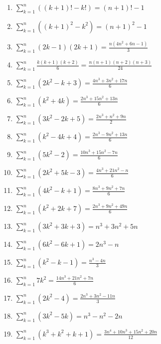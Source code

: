 \documentclass[11pt,a4paper]{article}
\begin{document}
\begin{enumerate}
\item $\displaystyle \sum_{k=1}^{n} \left(\left(k + 1\right)! - k!\right) = \left(n + 1\right)! - 1$
\item $\displaystyle \sum_{k=1}^{n} \left(\left(k + 1\right)^{2} - k^{2}\right) = \left(n + 1\right)^{2} - 1$
\item $\displaystyle \sum_{k=1}^{n} \left(2k - 1\right)\left(2k + 1\right) = \frac{n\left(4n^{2} + 6n - 1\right)}{3}$
\item $\displaystyle \sum_{k=1}^{n} \frac{k\left(k + 1\right)\left(k + 2\right)}{6} = \frac{n\left(n + 1\right)\left(n + 2\right)\left(n + 3\right)}{24}$
\item $\displaystyle \sum_{k=1}^{n} \left(2k^{2} - k + 3\right) = \frac{4n^{3} + 3n^{2} + 17n}{6}$
\item $\displaystyle \sum_{k=1}^{n} \left(k^{2} + 4k\right) = \frac{2n^{3} + 15n^{2} + 13n}{6}$
\item $\displaystyle \sum_{k=1}^{n} \left(3k^{2} - 2k + 5\right) = \frac{2n^{3} + n^{2} + 9n}{2}$
\item $\displaystyle \sum_{k=1}^{n} \left(k^{2} - 4k + 4\right) = \frac{2n^{3} - 9n^{2} + 13n}{6}$
\item $\displaystyle \sum_{k=1}^{n} \left(5k^{2} - 2\right) = \frac{10n^{3} + 15n^{2} - 7n}{6}$
\item $\displaystyle \sum_{k=1}^{n} \left(2k^{2} + 5k - 3\right) = \frac{4n^{3} + 21n^{2} - n}{6}$
\item $\displaystyle \sum_{k=1}^{n} \left(4k^{2} - k + 1\right) = \frac{8n^{3} + 9n^{2} + 7n}{6}$
\item $\displaystyle \sum_{k=1}^{n} \left(k^{2} + 2k + 7\right) = \frac{2n^{3} + 9n^{2} + 49n}{6}$
\item $\displaystyle \sum_{k=1}^{n} \left(3k^{2} + 3k + 3\right) = n^{3} + 3n^{2} + 5n$
\item $\displaystyle \sum_{k=1}^{n} \left(6k^{2} - 6k + 1\right) = 2n^{3} - n$
\item $\displaystyle \sum_{k=1}^{n} \left(k^{2} - k - 1\right) = \frac{n^{3} - 4n}{3}$
\item $\displaystyle \sum_{k=1}^{n} 7k^{2} = \frac{14n^{3} + 21n^{2} + 7n}{6}$
\item $\displaystyle \sum_{k=1}^{n} \left(2k^{2} - 4\right) = \frac{2n^{3} + 3n^{2} - 11n}{3}$
\item $\displaystyle \sum_{k=1}^{n} \left(3k^{2} - 5k\right) = n^{3} - n^{2} - 2n$
\item $\displaystyle \sum_{k=1}^{n} \left(k^{3} + k^{2} + k + 1\right) = \frac{3n^{4} + 10n^{3} + 15n^{2} + 20n}{12}$

\end{enumerate}
\end{document}
